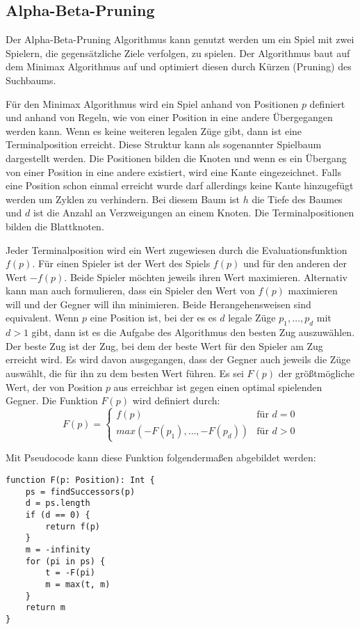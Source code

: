 \subsection{Alpha-Beta-Pruning}
Der Alpha-Beta-Pruning Algorithmus kann genutzt werden um ein Spiel mit zwei Spielern, die gegensätzliche Ziele verfolgen, zu spielen. Der Algorithmus baut auf dem Minimax Algorithmus auf und optimiert diesen durch Kürzen (Pruning) des Suchbaums.

Für den Minimax Algorithmus wird ein Spiel anhand von Positionen $p$ definiert und anhand von Regeln, wie von einer Position in eine andere Übergegangen werden kann. Wenn es keine weiteren legalen Züge gibt, dann ist eine Terminalposition erreicht. Diese Struktur kann als sogenannter Spielbaum dargestellt werden. Die Positionen bilden die Knoten und wenn es ein Übergang von einer Position in eine andere existiert, wird eine Kante eingezeichnet. Falls eine Position schon einmal erreicht wurde darf allerdings keine Kante hinzugefügt werden um Zyklen zu verhindern. Bei diesem Baum ist $h$ die Tiefe des Baumes und $d$ ist die Anzahl an Verzweigungen an einem Knoten. Die Terminalpositionen bilden die Blattknoten.
\cite{knuth_analysis_1975}

Jeder Terminalposition wird ein Wert zugewiesen durch die Evaluationsfunktion $f(p)$. Für einen Spieler ist der Wert des Spiels $f(p)$ und für den anderen der Wert $-f(p)$. Beide Spieler möchten jeweils ihren Wert maximieren. Alternativ kann man auch formulieren, dass ein Spieler den Wert von $f(p)$ maximieren will und der Gegner will ihn minimieren.
Beide Herangehensweisen sind equivalent. Wenn $p$ eine Position ist, bei der es es $d$ legale Züge $p_1,\ldots,p_d$ mit $d > 1$ gibt, dann ist es die Aufgabe des Algorithmus den besten Zug auszuwählen. Der beste Zug ist der Zug, bei dem der beste Wert für den Spieler am Zug erreicht wird. Es wird davon ausgegangen, dass der Gegner auch jeweils die Züge auswählt, die für ihn zu dem besten Wert führen. Es sei $F(p)$ der größtmögliche Wert, der von Position $p$ aus erreichbar ist gegen einen optimal spielenden Gegner. Die Funktion $F(p)$ wird definiert durch:
\begin{equation}
    F(p) = 
    \begin{cases}
        f(p) & \text{für } d = 0 \\
        max(-F(p_1),\ldots,-F(p_d)) & \text{für } d > 0
    \end{cases}
\end{equation}

Mit Pseudocode kann diese Funktion folgendermaßen abgebildet werden:
\begin{lstlisting}
function F(p: Position): Int {
    ps = findSuccessors(p)
    d = ps.length
    if (d == 0) {
        return f(p)
    }
    m = -infinity
    for (pi in ps) {
        t = -F(pi)
        m = max(t, m)
    }
    return m
}
\end{lstlisting}

